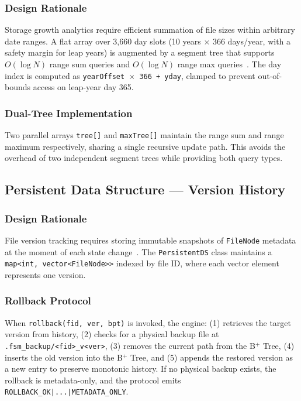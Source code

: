 \documentclass[conference]{IEEEtran}
\begin{document}
\subsubsection{Design Rationale}
Storage growth analytics require efficient summation of file sizes within arbitrary date ranges. A flat array over 3{,}660 day slots (10 years $\times$ 366 days/year, with a safety margin for leap years) is augmented by a segment tree that supports $O(\log N)$ range sum queries and $O(\log N)$ range max queries~\cite{deberg2008computational}. The day index is computed as \texttt{yearOffset $\times$ 366 + yday}, clamped to prevent out-of-bounds access on leap-year day 365.

\subsubsection{Dual-Tree Implementation}
Two parallel arrays \texttt{tree[]} and \texttt{maxTree[]} maintain the range sum and range maximum respectively, sharing a single recursive update path. This avoids the overhead of two independent segment trees while providing both query types.

\subsection{Persistent Data Structure — Version History}

\subsubsection{Design Rationale}
File version tracking requires storing immutable snapshots of \texttt{FileNode} metadata at the moment of each state change~\cite{driscoll1989making}. The \texttt{PersistentDS} class maintains a \texttt{map<int, vector<FileNode>>} indexed by file ID, where each vector element represents one version.

\subsubsection{Rollback Protocol}
When \texttt{rollback(fid, ver, bpt)} is invoked, the engine: (1) retrieves the target version from history, (2) checks for a physical backup file at \texttt{.fsm\_backup/<fid>\_v<ver>}, (3) removes the current path from the B$^+$ Tree, (4) inserts the old version into the B$^+$ Tree, and (5) appends the restored version as a new entry to preserve monotonic history. If no physical backup exists, the rollback is metadata-only, and the protocol emits \texttt{ROLLBACK\_OK|...|METADATA\_ONLY}.
\end{document}
